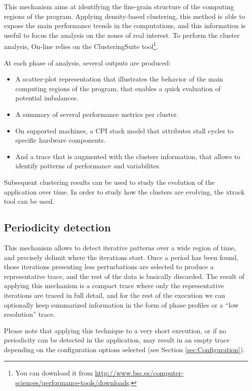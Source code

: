 This mechanism aims at identifying the fine-grain structure of the computing regions of the program. 
Applying density-based clustering, this method is able to expose the main performance trends in the 
computations, and this information is useful to focus the analysis on the zones of real interest. 
To perform the cluster analysis, \TRACE On-line relies on the ClusteringSuite tool\footnote{You can download it from \url{http://www.bsc.es/computer-sciences/performance-tools/downloads}.}.

At each phase of analysis, several outputs are produced:

\begin{itemize}
 \item A scatter-plot representation that illustrates the behavior of the main computing regions of the program, 
that enables a quick evaluation of potential imbalances.
 \item A summary of several performance metrics per cluster.
 \item On supported machines, a CPI stack model that attributes stall cycles to specific hardware components.
 \item And a trace that is augmented with the clusters information, that allows to identify 
patterns of performance and variabilites. 
\end{itemize}

Subsequent clustering results can be used to study the evolution of the application over time. In order
to study how the clusters are evolving, the xtrack tool can be used.


\subsection{Periodicity detection}

This mechanism allows to detect iterative patterns over a wide region of time, and precisely delimit where the 
iterations start. Once a period has been found, those iterations presenting less perturbations are selected to 
produce a representative trace, and the rest of the data is basically discarded. The result of applying this 
mechanism is a compact trace where only the representative iterations are traced in full detail, and for the 
rest of the execution we can optionally keep summarized information in the form of phase profiles or 
a ``low resolution'' trace. 

Please note that applying this technique to a very short execution, or if no periodicity can be detected in the 
application, may result in an empty trace depending on the configuration options selected (see Section 
\ref{sec:Configuration}).


